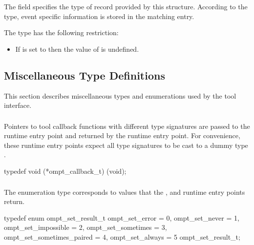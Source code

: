 \descr
The field  specifies the type of record provided by this structure.
According to the type, event specific information is stored in the matching
 entry.

\restrictions
The  type has the following restriction:

\begin{itemize}
\item If  is set to  then
      the value of  is undefined.
\end{itemize}



\subsection{Miscellaneous Type Definitions}
\label{sec:ompt-types:misc}
This section describes miscellaneous types and enumerations used by the tool interface.



\subsubsection{}
\label{sec:ompt_callback_t}

\summary
Pointers to tool callback functions with different type signatures are 
passed to the  runtime entry point and returned 
by the  runtime entry point. For convenience,
these runtime entry points expect all type signatures to be cast to
a dummy type .

\format
\begin{ccppspecific}
\begin{omptCallback}
typedef void (*ompt_callback_t) (void);
\end{omptCallback}
\end{ccppspecific}


\subsubsection{}
\label{sec:ompt_set_result_t}

\summary
The  enumeration type corresponds to values that 
the ,  and 
 runtime entry points return.

\format
\begin{ccppspecific}
\begin{omptEnum}
typedef enum ompt_set_result_t {
  ompt_set_error            = 0,
  ompt_set_never            = 1,
  ompt_set_impossible       = 2,
  ompt_set_sometimes        = 3,
  ompt_set_sometimes_paired = 4,
  ompt_set_always           = 5
} ompt_set_result_t;
\end{omptEnum}
\end{ccppspecific}

